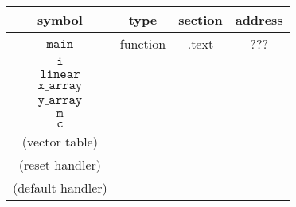 \begin{tabular}{|c|c|c|c|}
	\hline
	\textbf{symbol}   & \textbf{type} & \textbf{section} & \textbf{address} \\
	\hline
	\(\texttt{main}\)              & function      & .text            & ???              \\
	\hline
	\(\texttt{i}\)                 &               &                  &                  \\
	\hline
	\(\texttt{linear}\)            &               &                  &                  \\
	\hline
	\(\texttt{x\_array}\)          &               &                  &                  \\
	\hline
	\(\texttt{y\_array}\)          &               &                  &                  \\
	\hline
	\(\texttt{m}\)                 &               &                  &                  \\
	\hline
	\(\texttt{c}\)                 &               &                  &                  \\
	\hline
	(vector table)    &               &                  &                  \\
	\hline
	(reset handler)   &               &                  &                  \\
	\hline
	(default handler) &               &                  &                  \\
	\hline
\end{tabular}
